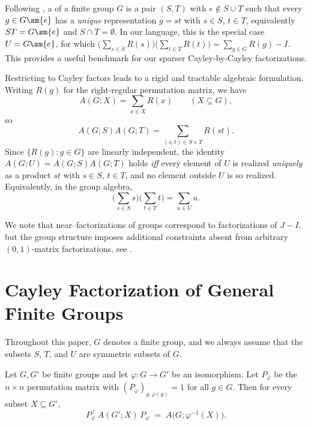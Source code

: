 \documentclass{file}
\begin{document}
Following \citet{decaen}, a  of a finite group $G$
is a pair $(S,T)$ with $e\notin S\cup T$ such that every $g\in G\sm \{e\}$ has a
\emph{unique} representation $g=st$ with $s\in S$, $t\in T$, equivalently
$ST=G\sm \{e\}$ and $S\cap T=\emptyset$.
In our language, this is the special case $U=G\sm \{e\}$, for which
$\bigl(\sum_{s\in S}R(s)\bigr)\bigl(\sum_{t\in T}R(t)\bigr)=\sum_{g\in G}R(g)-I$.  
This provides a useful benchmark
for our sparser Cayley‑by‑Cayley factorizations.

Restricting to Cayley factors leads to a rigid and tractable algebraic formulation.  Writing $R(g)$ for the right‑regular permutation matrix, we have
\[
A(G;X)=\sum_{x\in X} R(x)\qquad(X\subseteq G),
\]
so
\[
A(G;S)A(G;T)=\sum_{(s,t)\in S\times T} R(st).
\]
Since $\{R(g):g\in G\}$ are linearly independent, the identity
$
A(G;U)=A(G;S)A(G;T)
$
holds \emph{iff} every element of $U$ is realized \emph{uniquely} as a product $st$ with $s\in S$, $t\in T$, and no element outside $U$ is so realized.  Equivalently, in the group algebra,
\[
\Big(\sum_{s\in S}s\Big)\Big(\sum_{t\in T}t\Big)=\sum_{u\in U}u.
\]


We note that near–factorizations of groups correspond to factorizations of $J-I$, but the group structure
imposes additional constraints absent from arbitrary $(0,1)$-matrix factorizations, see
\citet{decaen}.





\section{Cayley Factorization of General Finite Groups}

Throughout this paper, $G$ denotes a finite group, and we always assume that the subsets $S$, $T$, and $U$ are symmetric subsets of $G$.



\begin{lem}\label{lem:relabel}
Let $G,G'$ be finite groups and let $\varphi\colon G\to G'$ be an isomorphism.
Let $P_\varphi$ be the $n\times n$ permutation matrix with
$(P_\varphi)_{g,\varphi(g)}=1$ for all $g\in G$.
Then for every subset $X\subseteq G'$,
\[
P_\varphi^{\!\top}\,A(G';X)\,P_\varphi \;=\; A\bigl(G;\varphi^{-1}(X)\bigr).
\]
\end{lem}
\end{document}
